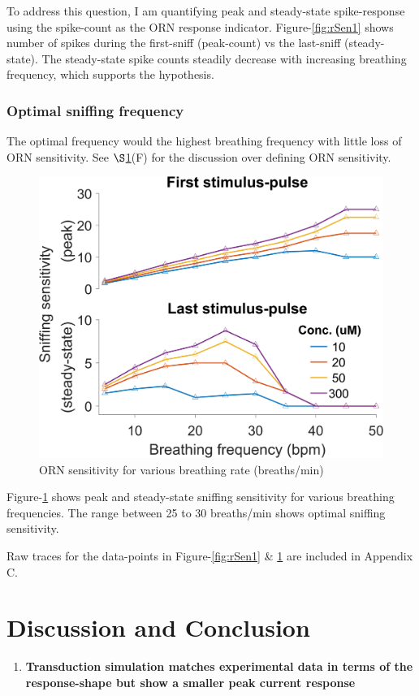 \documentclass[
]{article}
\providecommand{\tightlist}{%
  \setlength{\itemsep}{0pt}\setlength{\parskip}{0pt}}
\begin{document}
To address this question, I am quantifying peak and steady-state spike-response using the spike-count as the ORN response indicator. Figure-\ref{fig:rSen1} shows number of spikes during the first-sniff (peak-count) vs the last-sniff (steady-state). The steady-state spike counts steadily decrease with increasing breathing frequency, which supports the hypothesis.

\hypertarget{optimal-sniffing-frequency}{%
\subsubsection{Optimal sniffing frequency}\label{optimal-sniffing-frequency}}

The optimal frequency would the highest breathing frequency with little loss of ORN sensitivity. See \(\S\)\ref{CD}(F) for the discussion over defining ORN sensitivity.

\begin{figure}

{\centering \includegraphics[width=0.5\linewidth]{figs/v1/fig_sniff_freq_FR_tuning_gain} 

}

\caption{ORN sensitivity for various breathing rate (breaths/min)}\label{fig:rSen2}
\end{figure}

Figure-\ref{fig:rSen2} shows peak and steady-state sniffing sensitivity for various breathing frequencies. The range between 25 to 30 breaths/min shows optimal sniffing sensitivity.

Raw traces for the data-points in Figure-\ref{fig:rSen1} \& \ref{fig:rSen2} are included in Appendix C.

\hypertarget{CD}{%
\section{Discussion and Conclusion}\label{CD}}

\begin{enumerate}
\def\labelenumi{\Alph{enumi}.}
\tightlist
\item
  \textbf{Transduction simulation matches experimental data in terms of the response-shape but show a smaller peak current response}
\end{enumerate}
\end{document}
